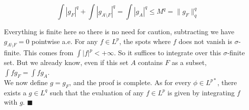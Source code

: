 \documentclass[../main.tex]{subfiles}
\begin{document}
$$
\int |g_F|^q + \int |g_{A\setminus F}|^q = \int |g_A|^q \leq M^q = \lVert g_F \rVert^q_q
$$

Everything is finite here so there is no need for caution, subtracting we have $g_{A\setminus F} = 0$ pointwise a.e. For any $f\in L^p$, the spots where $f$ does not vanish is $\sigma$-finite. This comes from $\int |f|^p < +\infty$. So it suffices to integrate over this $\sigma$-finite set. But we already know, even if this set $A$ contains $F$ as a subset,  $\int fg_{F} = \int fg_{A}$.\\

We now define $g = g_F$, and the proof is complete. As for every $\phi\in L^{p*}$, there exists a $g\in L^q$ such that the evaluation of any $f\in L^p$ is given by integrating $f$ with $g$. $\blacksquare$
\end{document}
